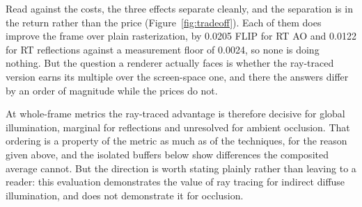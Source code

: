 Read against the costs, the three effects separate cleanly, and the separation is in the return
rather than the price (Figure~\ref{fig:tradeoff}). Each of them does improve the frame over plain
rasterization, by 0.0205 FLIP for RT AO and 0.0122 for RT reflections against a measurement floor of
0.0024, so none is doing nothing. But the question a renderer actually faces is whether the
ray-traced version earns its multiple over the screen-space one, and there the answers differ by an
order of magnitude while the prices do not.

At whole-frame metrics the ray-traced advantage is therefore decisive for global illumination,
marginal for reflections and unresolved for ambient occlusion. That ordering is a property of the
metric as much as of the techniques, for the reason given above, and the isolated buffers below show
differences the composited average cannot. But the direction is worth stating plainly rather than
leaving to a reader: this evaluation demonstrates the value of ray tracing for indirect diffuse
illumination, and does not demonstrate it for occlusion.

